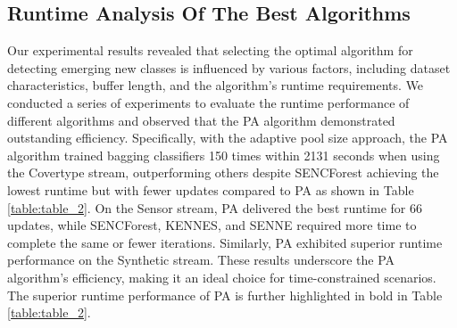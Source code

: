\subsection{Runtime Analysis Of The Best Algorithms}
\label{sec:running}
Our experimental results revealed that selecting the optimal algorithm for detecting emerging new classes is influenced by various factors, including dataset characteristics, buffer length, and the algorithm's runtime requirements. We conducted a series of experiments to evaluate the runtime performance of different algorithms and observed that the PA algorithm demonstrated outstanding efficiency. Specifically, with the adaptive pool size approach, the PA algorithm trained bagging classifiers 150 times within 2131 seconds when using the Covertype stream, outperforming others despite SENCForest achieving the lowest runtime but with fewer updates compared to PA as shown in Table \ref{table:table_2}. On the Sensor stream, PA delivered the best runtime for 66 updates, while SENCForest, KENNES, and SENNE required more time to complete the same or fewer iterations. Similarly, PA exhibited superior runtime performance on the Synthetic stream. These results underscore the PA algorithm’s efficiency, making it an ideal choice for time-constrained scenarios. The superior runtime performance of PA is further highlighted in bold in Table \ref{table:table_2}.
	
